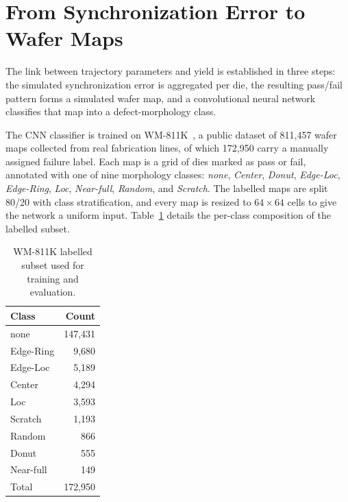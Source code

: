 \section{From Synchronization Error to Wafer Maps}\label{sec:methodology_cnn}

The link between trajectory parameters and yield is established in three steps: the simulated synchronization error is aggregated per die, the resulting pass/fail pattern forms a simulated wafer map, and a convolutional neural network classifies that map into a defect-morphology class.

The CNN classifier is trained on WM-811K~\cite{Wu2015_WM811K}, a public dataset of 811{,}457 wafer maps collected from real fabrication lines, of which 172{,}950 carry a manually assigned failure label. Each map is a grid of dies marked as pass or fail, annotated with one of nine morphology classes: \textit{none}, \textit{Center}, \textit{Donut}, \textit{Edge-Loc}, \textit{Edge-Ring}, \textit{Loc}, \textit{Near-full}, \textit{Random}, and \textit{Scratch}. The labelled maps are split 80/20 with class stratification, and every map is resized to $64 \times 64$ cells to give the network a uniform input. Table~\ref{tab:dataset} details the per-class composition of the labelled subset.

\begin{table}[htbp]
\centering
\caption{WM-811K labelled subset used for training and evaluation.}
\label{tab:dataset}
\begin{tabular}{lr}
\toprule
Class & Count \\
\midrule
none      & 147{,}431 \\
Edge-Ring & 9{,}680 \\
Edge-Loc  & 5{,}189 \\
Center    & 4{,}294 \\
Loc       & 3{,}593 \\
Scratch   & 1{,}193 \\
Random    & 866 \\
Donut     & 555 \\
Near-full & 149 \\
\midrule
Total     & 172{,}950 \\
\bottomrule
\end{tabular}
\end{table}

